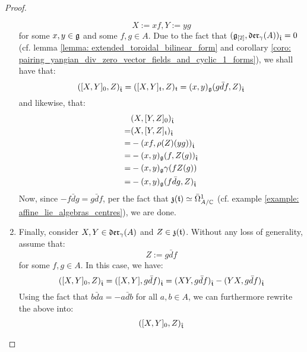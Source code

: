 \begin{proof}
\begin{enumerate}
                        $$X := xf, Y := yg$$
                    for some $x, y \in \g$ and some $f, g \in A$. Due to the fact that $(\g_{[2]}, \divzero)_{\extendedtoroidal} = 0$ (cf. lemma \ref{lemma: extended_toroidal_bilinear_form} and corollary \ref{coro: pairing_yangian_div_zero_vector_fields_and_cyclic_1_forms}), we shall have that:
                        $$( [X, Y]_0, Z )_{\extendedtoroidal} = ( [X, Y]_{\toroidal}, Z )_{\toroidal} = (x, y)_{\g} ( g \bar{d}f, Z )_{\extendedtoroidal}$$
                    and likewise, that:
                        $$
                            \begin{aligned}
                                & ( X, [Y, Z]_0 )_{\extendedtoroidal}
                                \\
                                = & ( X, [Y, Z]_{\toroidal} )_{\extendedtoroidal}
                                \\
                                = & -( xf, \rho(Z)(yg))_{\extendedtoroidal}
                                \\
                                = & -(x, y)_{\g} (f, Z(g))_{\extendedtoroidal}
                                \\
                                = & -(x, y)_{\g} \gamma(f Z(g))
                                \\
                                = & -(x, y)_{\g} (f \bar{d}g, Z)_{\extendedtoroidal}
                            \end{aligned}
                        $$
                    Now, since $-f \bar{d}g = g\bar{d}f$, per the fact that $\z(\toroidal) \cong \bar{\Omega}^1_{A/\bbC}$ (cf. example \ref{example: affine_lie_algebras_centres}), we are done. 
                    \item Finally, consider $X, Y \in \divzero$ and $Z \in \z(\toroidal)$. Without any loss of generality, assume that:
                        $$Z := g\bar{d}f$$
                    for some $f, g \in A$. In this case, we have:
                        $$( [X, Y]_0, Z )_{\extendedtoroidal} = ( [X, Y], g\bar{d}f )_{\extendedtoroidal} = ( XY, g\bar{d}f )_{\extendedtoroidal} - ( YX, g\bar{d}f )_{\extendedtoroidal}$$
                    Using the fact that $b\bar{d}a = -a\bar{d}b$ for all $a, b \in A$, we can furthermore rewrite the above into:
                        $$
                            \begin{aligned}
                                & ( [X, Y]_0, Z )_{\extendedtoroidal}
                                \\

\end{aligned}$$
\end{enumerate}
\end{proof}
